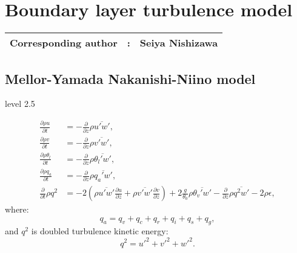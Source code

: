%

\section{Boundary layer turbulence model}
{\bf \Large
\begin{tabular}{ccc}
\hline
  Corresponding author & : & Seiya Nishizawa\\
\hline
\end{tabular}
}

\def\half{\frac{1}{2}}

\subsection{Mellor-Yamada Nakanishi-Niino model}
level 2.5

\begin{align}
  \frac{\partial \rho u}{\partial t}
  &= -\frac{\partial}{\partial z} \rho \overline{u'w'}, \\
  \frac{\partial \rho v}{\partial t}
  &= -\frac{\partial}{\partial z} \rho \overline{v'w'}, \\
  \frac{\partial \rho \theta_l}{\partial t}
  &= -\frac{\partial}{\partial z} \rho \overline{\theta_l'w'}, \\
  \frac{\partial \rho q_a}{\partial t}
  &= -\frac{\partial}{\partial z} \rho \overline{q_a'w'}, \\
  \frac{\partial }{\partial t}\rho q^2
  &= -2\left(\rho\overline{u'w'}\frac{\partial u}{\partial z}+\rho\overline{v'w'}\frac{\partial v}{\partial z}\right)
  +2\frac{g}{\theta_0}\rho\overline{\theta_v' w'}
  -\frac{\partial}{\partial z}\rho\overline{q^2w'}
  -2\rho\epsilon, \label{eq: q2}
\end{align}
where:
\begin{equation}
  q_a = q_v + q_c + q_r + q_i + q_s + q_g,
\end{equation}
and $q^2$ is doubled turbulence kinetic energy:
\begin{equation}
  q^2 = u'^2 + v'^2 + w'^2.
\end{equation}

